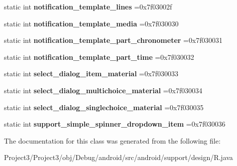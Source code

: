 \begin{DoxyCompactItemize}
\mbox{\label{classandroid_1_1support_1_1design_1_1R_1_1layout_a42dcd5b0474176e889b01538720337fd}} 
static int {\bfseries notification\+\_\+template\+\_\+lines} =0x7f03002f
\item 
\mbox{\label{classandroid_1_1support_1_1design_1_1R_1_1layout_a7ff1c447007f2a5f0588828e043152bb}} 
static int {\bfseries notification\+\_\+template\+\_\+media} =0x7f030030
\item 
\mbox{\label{classandroid_1_1support_1_1design_1_1R_1_1layout_a336a92a5e5ff5cda9d54adfe74c9b21e}} 
static int {\bfseries notification\+\_\+template\+\_\+part\+\_\+chronometer} =0x7f030031
\item 
\mbox{\label{classandroid_1_1support_1_1design_1_1R_1_1layout_a14683e667a30a9d5aef7048fd04fc7df}} 
static int {\bfseries notification\+\_\+template\+\_\+part\+\_\+time} =0x7f030032
\item 
\mbox{\label{classandroid_1_1support_1_1design_1_1R_1_1layout_ad68444842393b87dc0c8e4c7f5150f76}} 
static int {\bfseries select\+\_\+dialog\+\_\+item\+\_\+material} =0x7f030033
\item 
\mbox{\label{classandroid_1_1support_1_1design_1_1R_1_1layout_ab063f478219720767955259c7026ffb9}} 
static int {\bfseries select\+\_\+dialog\+\_\+multichoice\+\_\+material} =0x7f030034
\item 
\mbox{\label{classandroid_1_1support_1_1design_1_1R_1_1layout_a9ae643528755c51836f504034ab50c3f}} 
static int {\bfseries select\+\_\+dialog\+\_\+singlechoice\+\_\+material} =0x7f030035
\item 
\mbox{\label{classandroid_1_1support_1_1design_1_1R_1_1layout_a988f74aad0e2f594102956570b554a7e}} 
static int {\bfseries support\+\_\+simple\+\_\+spinner\+\_\+dropdown\+\_\+item} =0x7f030036
\end{DoxyCompactItemize}


The documentation for this class was generated from the following file\+:\begin{DoxyCompactItemize}
\item 
Project3/\+Project3/obj/\+Debug/android/src/android/support/design/R.\+java\end{DoxyCompactItemize}
